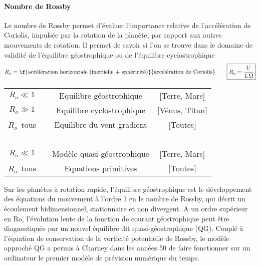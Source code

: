\mk
\paragraph{Nombre de Rossby} Le nombre de Rossby permet d'évaluer l'importance relative de l'accélération de Coriolis, impulsée par la rotation de la planète, par rapport aux autres mouvements de rotation. Il permet de savoir si l'on se trouve dans le domaine de validité de l'équilibre géostrophique ou de l'équilibre cyclostrophique
\[
R_o=\f{\text{accélération horizontale (inertielle + sphéricité)}}{\text{accélération de Coriolis}}\qquad\boxed{R_o=\frac{U}{L\,\Omega}}
\]
\begin{table}[h!]
\begin{tabular}{cccc}
$R_o \ll 1$ & \DDD{\bullet}\AAA{\bullet} & Equilibre g\'eostrophique & [Terre, Mars]\\
$R_o \gg 1$ & \DDD{\bullet}\CCC{\bullet} & Equilibre cyclostrophique & [Vénus, Titan]\\
$R_o$~tous & \DDD{\bullet}\AAA{\bullet}\CCC{\bullet} & Equilibre du vent gradient & [Toutes]\\
~ & & & \\
$R_o \ll 1$ & \DDD{\bullet}\AAA{\bullet}\BBB{\bullet} & Modèle quasi-g\'eostrophique & [Terre, Mars]\\
$R_o$~tous & \DDD{\bullet}\AAA{\bullet}\BBB{\bullet}\CCC{\bullet} & Equations primitives  & [Toutes]
\end{tabular}
\end{table}

\mk
Sur les planètes à rotation rapide, l'équilibre géostrophique est le développement des équations du mouvement à l'ordre 1 en le nombre de Rossby, qui décrit un écoulement bidimensionnel, stationnaire et non divergent. A un ordre supérieur en $\textrm{Ro}$, l'évolution lente de la fonction de courant géostrophique peut être diagnostiquée par un nouvel équilibre dit quasi-géostrophique (QG). Couplé à l'équation de conservation de la vorticité potentielle de Rossby, le modèle approché QG a permis à Charney dans les années 50 de faire fonctionner sur un ordinateur le premier modèle de prévision numérique du temps.
